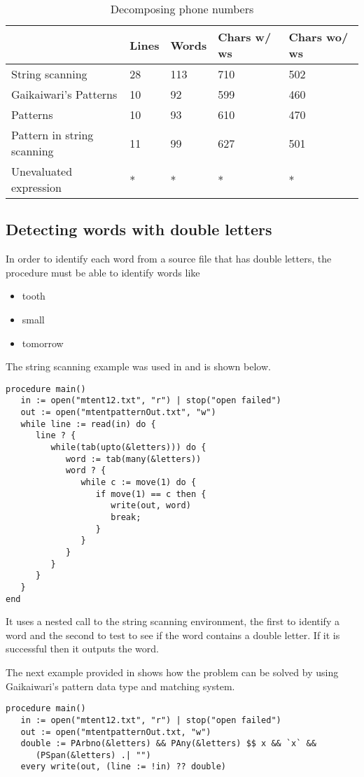 \documentclass{article}
\begin{document}
\begin{table}[ht]
	\caption{Decomposing phone numbers}
	\centering
	\begin{tabular}{|l|l|l|l|l|}
		\hline\hline
		 & Lines & Words & Chars w/ ws & Chars wo/ ws\\
		\hline
		String scanning & 28 & 113 & 710 & 502 \\
		Gaikaiwari's Patterns & 10 & 92 & 599 & 460 \\
		Patterns & 10 & 93 & 610 & 470 \\
		Pattern in string scanning & 11 & 99 & 627 & 501 \\
		Unevaluated expression & * & * & * & * \\
		\hline
	\end{tabular}
\end{table}

\subsection{Detecting words with double letters}
In order to identify each word from a source file that has double letters, the procedure must be able to identify words like
\begin{itemize}
\item tooth
\item small
\item tomorrow
\end{itemize}

The string scanning example was used in\cite{Gaikaiwari2005} and is shown below.
\begin{verbatim}
procedure main()
   in := open("mtent12.txt", "r") | stop("open failed")
   out := open("mtentpatternOut.txt", "w")
   while line := read(in) do {
      line ? {
         while(tab(upto(&letters))) do {
            word := tab(many(&letters))
            word ? {
               while c := move(1) do {
                  if move(1) == c then {
                     write(out, word)
                     break;
                  }
               }
            }
         }
      }
   }
end
\end{verbatim}
It uses a nested call to the string scanning environment, the first to identify a word and the second to test to see if the word contains a double letter.  If it is successful then it outputs the word.

The next example provided in \cite{Gaikaiwari2005} shows how the problem can be solved by using Gaikaiwari's pattern data type and matching system.  
\begin{verbatim}
procedure main()
   in := open("mtent12.txt", "r") | stop("open failed")
   out := open("mtentpatternOut.txt, "w")
   double := PArbno(&letters) && PAny(&letters) $$ x && `x` && 
      (PSpan(&letters) .| "")
   every write(out, (line := !in) ?? double)
\end{verbatim}
\end{document}
